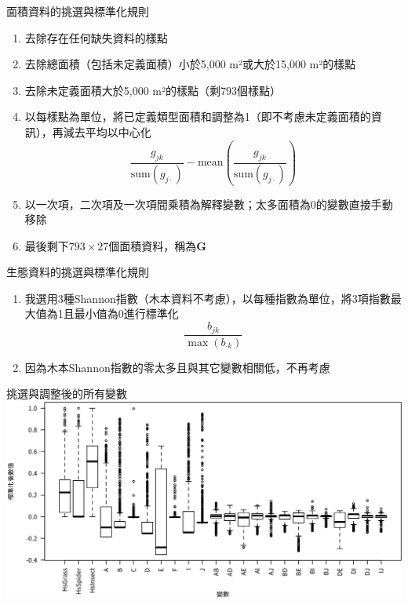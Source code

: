 \documentclass[10pt, aspectratio=1610, xcolor=table]{beamer}
\begin{document}
\begin{frame}{面積資料的挑選與標準化規則}
\begin{enumerate}
	\item 去除存在任何缺失資料的樣點
	\item 去除總面積（包括未定義面積）小於5,000 m²或大於15,000 m²的樣點
	\item 去除未定義面積大於5,000 m²的樣點（剩793個樣點）
	\item 以每樣點為單位，將已定義類型面積和調整為1（即不考慮未定義面積的資訊），再減去平均以中心化
		\[ 
			\frac{g_{jk}}{\mathrm{sum}(g_{j\cdot})} - 
			\mathrm{mean} \left( \frac{g_{jk}}{\mathrm{sum}(g_{j\cdot})} \right)
		\]
	\item 以一次項，二次項及一次項間乘積為解釋變數；太多面積為0的變數直接手動移除
	\item 最後剩下$793\times27$個面積資料，稱為$\mathbf{G}$
\end{enumerate}
\end{frame}


\begin{frame}{生態資料的挑選與標準化規則}
\begin{enumerate}
	\item 我選用3種Shannon指數（木本資料不考慮），以每種指數為單位，將3項指數最大值為1且最小值為0進行標準化
		\[ \frac{b_{jk}}{\max(b_{\cdot k})} \]
	\item 因為木本Shannon指數的零太多且與其它變數相關低，不再考慮
\end{enumerate}
\end{frame}



\begin{frame}{挑選與調整後的所有變數}
\includegraphics[width=1\textwidth]{var-summary.png}
\end{frame}
\end{document}
